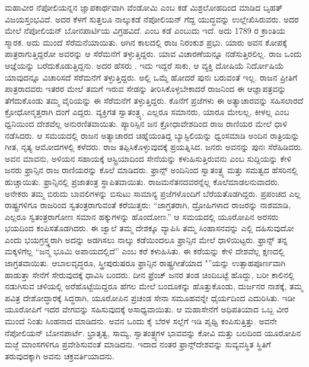 ಮಹಾವೀರ ನೆಪೋಲಿಯನ್ನನ ಜ್ಞಾಪಕಾರ್ಥವಾಗಿ ವೆಂಡೋಮಿ ಎಂಬ ಕಡೆ ಮಿಶ್ರ\break ಲೋಹದಿಂದ ಮಾಡಿದ ಬೃಹತ್​ ವಿಜಯಸ್ತಂಭವಿದೆ. ಅದರ ಕೆಳಗೆ ಸುತ್ತಲೂ ನಾಲ್ಕುಕಡೆ ನೆಪೋಲಿಯನ್​ ಗೆದ್ದ ಯುದ್ಧವನ್ನು ಉಲ್ಲೇಖಿಸಿರುವರು. ಅದರ ಮೇಲೆ ನೆಪೋಲಿಯನ್​ ಬೋನಪಾರ್ಟಿಯ ವಿಗ್ರಹವಿದೆ.  ಎಂಬ ಕಡೆ  ಎಂಬುದು ಇದೆ. ಅದು 1789 ರ ಕ್ರಾಂತಿಯ ಸ್ಮಾರಕ. ಅದು ಮುಂದೆ ಸೆರೆಮನೆಯಾಯಿತು. ಆಗಿನ ಕಾಲದಲ್ಲಿ ರಾಜ ನಿರಂಕುಶ ಪ್ರಭು. ಯಾರು ಅವನ ಕೋಪಕ್ಕೆ ಪಾತ್ರರಾಗುತ್ತಿದ್ದರೋ ಅವರನ್ನು ಆ ಸೆರೆಮನೆಗೆ ತಳ್ಳುತ್ತಿದ್ದರು. ಯಾವ ವಿಚಾರಣೆಯನ್ನೂ ನಡೆಸುತ್ತಿರಲಿಲ್ಲ. ರಾಜ ಒಂದು ಆಜ್ಞೆಯನ್ನು ಬರೆದುಕೊಡುತ್ತಿದ್ದನು. ಅದರ ಹೆಸರು . ಇದು ಇದ್ದರೆ ಸಾಕು, ಆ ವ್ಯಕ್ತಿ ದೋಷಿಯೆ ನಿರ್ದೋಷಿಯೆ ಯಾವುದನ್ನೂ ವಿಚಾರಿಸದೆ ಸೆರೆಮನೆಗೆ ತಳ್ಳುತ್ತಿದ್ದರು. ಅಲ್ಲಿ ಒಮ್ಮೆ ಹೋದರೆ ಪುನಃ ಬರುವಂತೆ ಇಲ್ಲ. ರಾಜನ ಪ್ರೀತಿಗೆ ಪಾತ್ರರಾದವರು ಇತರರ ಮೇಲೆ ತಮಗೆ ಇರುವ ಸೇಡನ್ನು ತೀರಿಸಿಕೊಳ್ಳಬೇಕಾದರೆ ರಾಜನಿಂದ ಈ ಆಜ್ಞಾಪತ್ರವನ್ನು ತೆಗೆದುಕೊಂಡು ತಮ್ಮ ವೈರಿಯನ್ನು ಈ ಸೆರೆಮನೆಗೆ ತಳ್ಳುತ್ತಿದ್ದರು. ಕೊನೆಗೆ ಪ್ರಜೆಗಳು ಈ ಅತ್ಯಾಚಾರವನ್ನು ಸಹಿಸಲಾರದೆ ಕ್ರೋಧೋನ್ಮತ್ತರಾಗಿ ದಂಗೆ ಎದ್ದರು. ವ್ಯಕ್ತಿಗತ ಸ್ವಾತಂತ್ರ್ಯ, ಎಲ್ಲರೂ ಸಮಾನರು, ಯಾರೂ ಮೇಲಲ್ಲ, ಕೀಳಲ್ಲ ಎಂಬ ಧ್ವನಿಯಿಂದ ದೇಶವೆಲ್ಲ ಅನುರಣಿತವಾಯಿತು. ಪ್ಯಾರಿಸ್ಸಿನ ಜನ ಕ್ರೋಧಾವೇಶದಿಂದ ರಾಜ ರಾಣಿಯರ ಮೇಲೆ ಧಾಳಿ ನಡೆಸಿದರು. ಆ ಸಮಯದಲ್ಲಿ ರಾಜನ ಅತ್ಯಾಚಾರದ ಚಿಹ್ನೆಯಂತಿದ್ದ ಬ್ಯಾಸ್ಟಿಲಿಯನ್ನು ಧ್ವಂಸಮಾಡಿ ಅಂದಿನ ರಾತ್ರಿಯನ್ನು ಗೀತ, ನೃತ್ಯ ಆಮೋದಗಳಲ್ಲಿ ಕಳೆದರು. ರಾಜ ತಪ್ಪಿಸಿಕೊಳ್ಳುವುದಕ್ಕೆ ಪ್ರಯತ್ನಿಸಿದ. ಜನರು ಅವನನ್ನು ಪುನಃ ಸೆರೆಹಿಡಿದರು. ಅವನ ಮಾವನು, ಅಳಿಯನ ಸಹಾಯಕ್ಕೆ ಆಸ್ಟ್ರಿಯಾದಿಂದ ಸೇನೆಯನ್ನು ಕಳುಹಿಸುತ್ತಿರುವನು ಎಂಬ ಸುದ್ದಿಯನ್ನು ಕೇಳಿ ಜನರು ಫ್ರಾನ್ಸಿನ ರಾಜ ರಾಣಿಯರನ್ನು ಕೊಲೆ ಮಾಡಿದರು. ಫ್ರಾನ್ಸ್​ ಅಂದಿನಿಂದ ಸ್ವಾತಂತ್ರ್ಯ ಮತ್ತು ಸಮತ್ವದ ಹೆಸರಿನಲ್ಲಿ ಹುಚ್ಚಾಯಿತು. ಫ್ರಾನ್ಸಿನಲ್ಲಿ ಪ್ರಜಾತಂತ್ರ ಸ್ಥಾಪಿತವಾಯಿತು. ರಾಜಮನೆತನದವರನ್ನೆಲ್ಲ ಕೊಲೆಮಾಡಲನುವಾದರು. ಅನೇಕರು ತಮ್ಮ ಬಿರುದು ಬಾವಲಿಗಳನ್ನು ಬಿಸುಟು ಸಾಮಾನ್ಯ ಪ್ರಜೆಗಳೊಂದಿಗೆ ಬೆರೆಯತೊಡಗಿದ್ದರು. ಪ್ರಪಂಚದ ಎಲ್ಲ ರಾಷ್ಟ್ರಗಳಿಗೂ ರಾಜರಿಂದ ಸ್ವತಂತ್ರರಾಗುವಂತೆ ಕರೆಯಿತ್ತರು: “ಜಾಗ್ರತರಾಗಿ, ದ್ರೋಹಿಗಳಾದ ರಾಜರನ್ನು ನಾಶಮಾಡಿ, ಎಲ್ಲರೂ ಸ್ವತಂತ್ರರಾಗೋಣ ಸಮಾನ ಹಕ್ಕುಗಳನ್ನು ಹೊಂದೋಣ.” ಆ ಸಮಯದಲ್ಲಿ ಯೂರೋಪಿನ ಅರಸರು ಭಯದಿಂದ ಕಂಪಿಸತೊಡಗಿದರು. ಈ ಜ್ವಾಲೆ ತಮ್ಮ ದೇಶಕ್ಕೂ ವ್ಯಾಪಿಸಿ ತಮ್ಮ ಸಿಂಹಾಸನವನ್ನು ಎಲ್ಲಿ ದಹಿಸುವುದೋ ಎಂದು ಭಯಗ್ರಸ್ತ್ಥರಾಗಿ ಅದನ್ನು ಅಡಗಿಸಲು ನಾಲ್ಕು ಕಡೆಯಿಂದಲೂ ಫ್ರಾನ್ಸಿನ ಮೇಲೆ ಧಾಳಿಯಿಟ್ಟರು. ಫ್ರಾನ್ಸ್​ ತನ್ನ ಮಕ್ಕಳಿಗೆಲ್ಲ “ಜನ್ಮ ಭೂಮಿ ಅಪಾಯದಲ್ಲಿದೆ” ಎಂಬ ಕರೆ ಕಳುಹಿಸಿತು. ಈ ಕರೆಯನ್ನು ಕೇಳಿ ದೇಶವೆಲ್ಲ ಕ್ಷಣದಲ್ಲಿ ಜಾಗ್ರತವಾಯಿತು. ಆಬಾಲವೃದ್ಧರೂ, ಸ್ತ್ರೀಪುರುಷರೂ ಫ್ರಾನ್ಸಿನ ರಾಷ್ಟ್ರಗೀತೆಯಾದ "”ಯನ್ನು ಉತ್ಸಾಹಪೂರ್ಣವಾಗಿ ಹಾಡುತ್ತಾ ಸೇನೆಗೆ ಸೇರುವುದಕ್ಕೆ ಧಾವಿಸಿ ಬಂದರು. ದೀನ ಫ್ರೆಂಚ್​ ಜನರ ತಂಡ ಚಿಂದಿಬಟ್ಟೆ ಹೊದ್ದು, ಬರೀ ಕಾಲಿನಲ್ಲಿ ನಡುಗಿಸುವ ಚಳಿಯಲ್ಲಿ ಅರೆಹೊಟ್ಟೆಯಿದ್ದರೂ ಹೆಗಲ ಮೇಲೆ ಬಂದೂಕನ್ನು ಹೊತ್ತುಕೊಂಡು, ದುರ್ಜನರ ನಾಶಕ್ಕೆ, ತಮ್ಮ ಪವಿತ್ರ ದೇಶೋದ್ಧಾರಕ್ಕೆ ಸಿದ್ಧರಾಗಿ, ಯೂರೋಪಿನ ಪ್ರಚಂಡ ಸೇನಾ ಸಮೂಹವನ್ನೇ ಧೈರ್ಯದಿಂದ ಎದುರಿಸಿತು. ಇಡೀ ಯೂರೋಪಿಗೆ ಇದರ ವೇಗವನ್ನು ಸಹಿಸುವುದಕ್ಕೆ ಅಸಾಧ್ಯವಾಯಿತು. ಆ ಮಹಾಸೇನೆಗೆ ಅಧಿಪತಿಯಾದ ಒಬ್ಬ ವೀರ ಮುಂದೆ ನಿಂತು ಸಿಂಹನಾದ ಮಾಡಿದನು. ಅವನ ಒಂದು ಕೈ ಬೆರಳ ಸಲ್ಲೆಗೆ ಇಡಿ ಪೃಥ್ವಿ ಕಂಪಿಸುತ್ತಿತ್ತು. ಅವನೇ ನೆಪೋಲಿಯನ್​ ಬೋನಪಾರ್ಟೆ. ಭ್ರಾತೃತ್ವ, ಸಾಮ್ಯ, ಸ್ವಾತಂತ್ರ್ಯಗಳ ಭಾವವನ್ನು ಕೋವಿ ಮತ್ತು ಬಲದಿಂದ ಯೂರೋಪಿನ ಮಜ್ಜೆ ಮಾಂಸಗಳಿಗೂ ಪ್ರವೇಶಿಸುವಂತೆ ಮಾಡಿದನು. ಇದಾದ ನಂತರ ಫ್ರಾನ್ಸ್​ ದೇಶವನ್ನು ಸುವ್ಯವಸ್ಥಿತ ಸ್ಥಿತಿಗೆ ತರುವುದಕ್ಕಾಗಿ ಅವನು ಚಕ್ರವರ್ತಿಯಾದನು.

